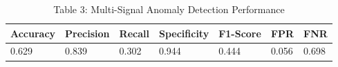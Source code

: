 \begin{table}
\caption{Table 3: Multi-Signal Anomaly Detection Performance}
\label{tab:table3_detection_performance}
\begin{tabular}{lllllll}
\toprule
Accuracy & Precision & Recall & Specificity & F1-Score & FPR & FNR \\
\midrule
0.629 & 0.839 & 0.302 & 0.944 & 0.444 & 0.056 & 0.698 \\
\bottomrule
\end{tabular}
\end{table}
